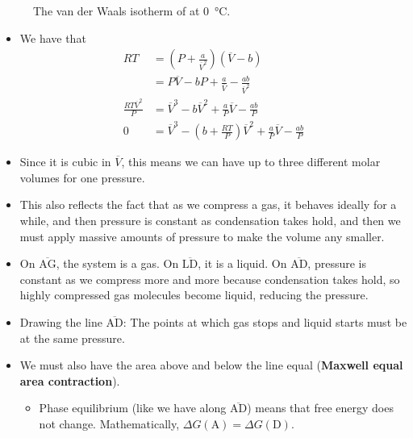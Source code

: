 \documentclass[../notes.tex]{subfiles}
\begin{document}
\begin{itemize}
\begin{figure}[h!]
        \caption{The van der Waals isotherm of  at \SI{0}{\celsius}.}
        \label{fig:vanDerWaalsIsotherm}
    \end{figure}
    \begin{itemize}
        \item We have that
        \begin{align*}
            RT &= \left( P+\frac{a}{\overline{V}^2} \right)(\overline{V}-b)\\
            &= P\overline{V}-bP+\frac{a}{\overline{V}}-\frac{ab}{\overline{V}^2}\\
            \frac{RT\overline{V}^2}{P} &= \overline{V}^3-b\overline{V}^2+\frac{a}{P}\overline{V}-\frac{ab}{P}\\
            0 &= \overline{V}^3-\left( b+\frac{RT}{P} \right)\overline{V}^2+\frac{a}{P}\overline{V}-\frac{ab}{P}
        \end{align*}
        \item Since it is cubic in $\overline{V}$, this means we can have up to three different molar volumes for one pressure.
        \item This also reflects the fact that as we compress a gas, it behaves ideally for a while, and then pressure is constant as condensation takes hold, and then we must apply massive amounts of pressure to make the volume any smaller.
        \item On $\overline{\text{AG}}$, the system is a gas. On $\overline{\text{LD}}$, it is a liquid. On $\overline{\text{AD}}$, pressure is constant as we compress more and more because condensation takes hold, so highly compressed gas molecules become liquid, reducing the pressure.
        \item Drawing the line $\overline{\text{AD}}$: The points at which gas stops and liquid starts must be at the same pressure.
        \item We must also have the area above and below the line equal (\textbf{Maxwell equal area contraction}).
        \begin{itemize}
            \item Phase equilibrium (like we have along $\overline{\text{AD}}$) means that free energy does not change. Mathematically, $\Delta G(\text{A})=\Delta G(\text{D})$.

\end{itemize}
\end{itemize}
\end{itemize}
\end{document}
